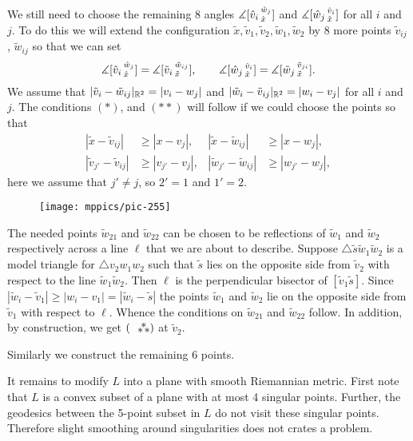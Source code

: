 \documentclass{article}
\begin{document}
We still need to choose the remaining 8 angles $\measuredangle [\hat v_i\,{}^{\hat w_j}_{\hat x}]$ and $\measuredangle [\hat w_j\,{}^{\hat v_i}_{\hat x}]$ for all $i$ and $j$.
To do this we will extend the configuration $\tilde x,\tilde v_1,\tilde v_2,\tilde w_1,\tilde w_2$ by 8 more points 
$\tilde v_{ij}$, $\tilde w_{ij}$ so that we can set 
\[
\measuredangle [\hat v_i\,{}^{\hat w_j}_{\hat x}]=\measuredangle [\tilde v_i\,{}^{\tilde w_{ij}}_{\tilde x}],
\qquad
\measuredangle [\hat w_j\,{}^{\hat v_i}_{\hat x}]=\measuredangle [\tilde w_j\,{}^{\tilde v_{ji}}_{\tilde x}].
\]
We assume that $|\tilde v_i-\tilde w_{ij}|_{\mathbb{R}^2}=|v_i-w_j|$ and $|\tilde w_i-\tilde v_{ij}|_{\mathbb{R}^2}=|w_i-v_j|$ for all $i$ and~$j$.
The conditions $({*})$, and $({*}{*})$ will follow if we could choose the points so that
\begin{align*}
|\tilde x-\tilde v_{ij}|&\ge | x-v_j|,
&
|\tilde x-\tilde w_{ij}|&\ge | x-w_j|,
\\
|\tilde v_{j'}-\tilde v_{ij}|&\ge | v_{j'}-v_j|,
&
|\tilde w_{j'}-\tilde w_{ij}|&\ge |w_{j'}-w_j|,
\end{align*}
here we assume that $j'\ne j$, so $2'=1$ and $1'=2$.

\begin{wrapfigure}{r}{35mm}
\vskip-4mm
\centering
\texttt{[image: mppics/pic-255]}
\end{wrapfigure}

The needed points $\tilde w_{21}$ and $\tilde w_{22}$ can be chosen to be reflections of $\tilde w_{1}$ and $\tilde w_{2}$ respectively across a line $\ell$ that we are about to describe.
Suppose $\triangle \tilde s\tilde w_1 \tilde w_2$ is a model triangle for $\triangle v_2w_1w_2$ such that $\tilde s$ lies on the opposite side from $\tilde v_2$ with respect to the line $\tilde w_1\tilde w_2$.
Then $\ell$ is the perpendicular bisector of $[\tilde v_1 \tilde s]$.
Since $|\tilde w_i-\tilde v_1|\ge | w_i- v_1|=|\tilde w_i-\tilde s|$ the points $\tilde w_1$ and $\tilde w_2$ lie on the opposite side from $\tilde v_1$ with respect to $\ell$.
Whence the conditions on $\tilde w_{21}$ and $\tilde w_{22}$ follow.
In addition, by construction, we get $(\asterism)$ at $\tilde v_2$.

Similarly we construct the remaining 6 points.

 It remains to modify $L$ into a plane with smooth Riemannian metric.
First note that $L$ is a convex subset of a plane with at most 4 singular points.
Further, the geodesics between the 5-point subset in $L$ do not visit these singular points.
Therefore slight smoothing around singularities does not crates a problem.
\qeds
\end{document}
